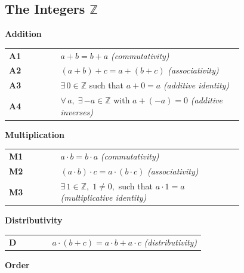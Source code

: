 \subsection{The Integers $\mathbb{Z}$}

\begin{tcolorbox}[colback=axiombox, colframe=axiomborder, arc=2pt,
  left=6pt, right=6pt, top=4pt, bottom=4pt,
  title={\small\textbf{Axioms for $\mathbb{Z}$ — Ordered Commutative Ring}},
  fonttitle=\small\bfseries]

\medskip
\noindent\textbf{Addition}

\medskip
\begin{tabular}{@{} l p{0.78\linewidth} @{}}
\textbf{A1} & $a + b = b + a$ \hfill\textit{(commutativity)} \\[3pt]
\textbf{A2} & $(a + b) + c = a + (b + c)$ \hfill\textit{(associativity)} \\[3pt]
\textbf{A3} & $\exists\, 0 \in \mathbb{Z}$ such that $a + 0 = a$
             \hfill\textit{(additive identity)} \\[3pt]
\textbf{A4} & $\forall\, a,\; \exists\, {-a} \in \mathbb{Z}$ with
             $a + (-a) = 0$
             \hfill\textit{(additive inverses)} \\[6pt]
\end{tabular}

\noindent\textbf{Multiplication}

\medskip
\begin{tabular}{@{} l p{0.78\linewidth} @{}}
\textbf{M1} & $a \cdot b = b \cdot a$ \hfill\textit{(commutativity)} \\[3pt]
\textbf{M2} & $(a \cdot b) \cdot c = a \cdot (b \cdot c)$
             \hfill\textit{(associativity)} \\[3pt]
\textbf{M3} & $\exists\, 1 \in \mathbb{Z},\; 1 \neq 0,$ such that $a \cdot 1 = a$
             \hfill\textit{(multiplicative identity)} \\[6pt]
\end{tabular}

\noindent\textbf{Distributivity}

\medskip
\begin{tabular}{@{} l p{0.78\linewidth} @{}}
\textbf{D} & $a \cdot (b + c) = a \cdot b + a \cdot c$
            \hfill\textit{(distributivity)} \\[6pt]
\end{tabular}

\noindent\textbf{Order}


\end{tcolorbox}
